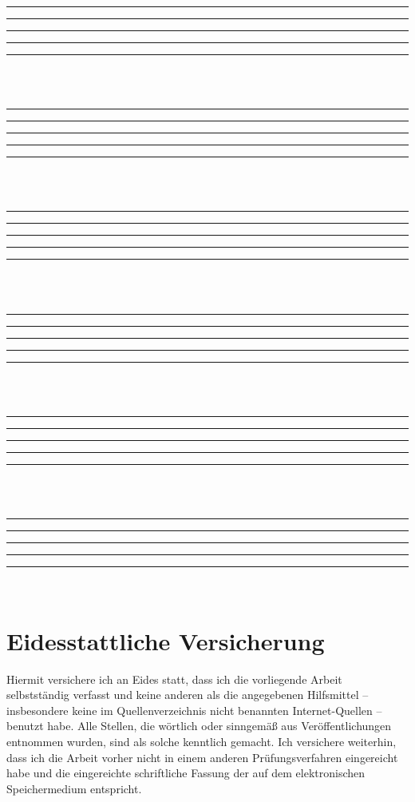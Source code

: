 \documentclass[
    fontsize=12pt,
    headings=small,
    parskip=half,           %
    bibliography=totoc,
    numbers=noenddot,       %
    open=any,               %
    ]{scrreprt}
\begin{document}
\hspace*{-2cm}\rule{3mm}{0.5pt}\rule{95mm}{0pt}\rule{0.5pt}{3mm}\rule{95mm}{0pt}\rule{3mm}{0.5pt}\\
\hspace*{-2cm}\usebox{\rumpsessBox}\usebox{\rumpsessBox}\\
\hspace*{-2cm}\rule{3mm}{0.5pt}\rule{95mm}{0pt}\rule{0.5pt}{3mm}\rule{95mm}{0pt}\rule{3mm}{0.5pt}\\
\hspace*{-2cm}\usebox{\rumpsessBox}\usebox{\rumpsessBox}\\
\hspace*{-2cm}\rule{3mm}{0.5pt}\rule{95mm}{0pt}\rule{0.5pt}{3mm}\rule{95mm}{0pt}\rule{3mm}{0.5pt}\\
\hspace*{-2cm}\usebox{\rumpsessBox}\usebox{\rumpsessBox}\\
\hspace*{-2cm}\rule{3mm}{0.5pt}\rule{95mm}{0pt}\rule{0.5pt}{3mm}\rule{95mm}{0pt}\rule{3mm}{0.5pt}\\
\hspace*{-2cm}\usebox{\rumpsessBox}\usebox{\rumpsessBox}\\
\hspace*{-2cm}\rule{3mm}{0.5pt}\rule{95mm}{0pt}\rule{0.5pt}{3mm}\rule{95mm}{0pt}\rule{3mm}{0.5pt}\\
\hspace*{-2cm}\usebox{\rumpsessBox}\usebox{\rumpsessBox}\\
\hspace*{-2cm}\rule{3mm}{0.5pt}\rule{95mm}{0pt}\rule{0.5pt}{3mm}\rule{95mm}{0pt}\rule{3mm}{0.5pt}\\

\chapter*{Eidesstattliche Versicherung} %
\vspace{1cm}

%
Hiermit versichere ich an Eides statt, dass ich die vorliegende Arbeit selbstständig verfasst und keine anderen als die angegebenen Hilfsmittel – insbesondere keine im Quellenverzeichnis nicht benannten Internet-Quellen – benutzt habe. Alle Stellen, die wörtlich oder sinngemäß aus Veröffentlichungen entnommen wurden, sind als solche kenntlich gemacht. Ich versichere weiterhin, dass ich die Arbeit vorher nicht in einem anderen Prüfungsverfahren eingereicht habe und die eingereichte schriftliche Fassung der auf dem elektronischen Speichermedium entspricht.
\end{document}
